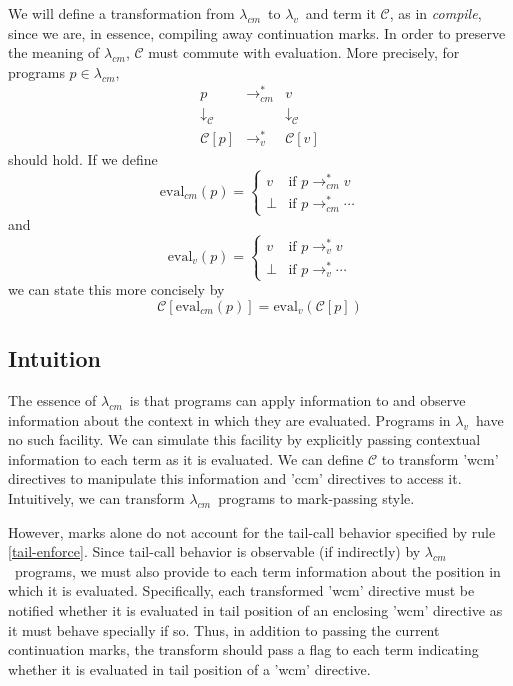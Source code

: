 \documentclass{llncs}
\newcommand{\cm}[0]{$\lambda_{cm}$}
\newcommand{\lv}[0]{$\lambda_v$}
\newcommand{\lvrrs}[0]{\rightarrow_v^{*}}
\newcommand{\cmrrs}[0]{\rightarrow_{cm}^{*}}
\newcommand{\C}[1]{\mathcal{C}[#1]}
\newcommand{\evalv}[1]{\mathrm{eval}_v(#1)}
\newcommand{\evalcm}[1]{\mathrm{eval}_{cm}(#1)}
\begin{document}
We will define a transformation from \cm\ to \lv\ and term it $\mathcal{C}$, as in \emph{compile}, since we are, in essence, compiling away continuation marks. In order to preserve the meaning of \cm, $\mathcal{C}$ must commute with evaluation. More precisely, for programs $p\in\lambda_{cm}$,
\[
\begin{array}{ccc}
p & \cmrrs & v\\
\downarrow_\mathcal{C} & & \downarrow_\mathcal{C}\\
\C{p} & \lvrrs & \C{v}
\end{array}
\]
should hold. If we define 
\begin{equation}
\evalcm{p}=\begin{cases}
v     &\text{if $p\cmrrs v$}\\
\perp &\text{if $p\cmrrs\cdots$}
\end{cases}
\end{equation}
and
\begin{equation}
\evalv{p}=\begin{cases}
v     &\text{if $p\lvrrs v$}\\
\perp &\text{if $p\lvrrs\cdots$}
\end{cases}
\end{equation}
we can state this more concisely by 
\begin{equation}
\C{\evalcm{p}}=\evalv{\C{p}}
\end{equation}

\subsection{Intuition}

The essence of \cm\ is that programs can apply information to and observe information about the context in which they are evaluated. Programs in \lv\ have no such facility. We can simulate this facility by explicitly passing contextual information to each term as it is evaluated. We can define $\mathcal{C}$ to transform \scheme'wcm' directives to manipulate this information and \scheme'ccm' directives to access it. Intuitively, we can transform \cm\ programs to mark-passing style.

However, marks alone do not account for the tail-call behavior specified by rule \ref{tail-enforce}. Since tail-call behavior is observable (if indirectly) by \cm\ programs, we must also provide to each term information about the position in which it is evaluated. Specifically, each transformed \scheme'wcm' directive must be notified whether it is evaluated in tail position of an enclosing \scheme'wcm' directive as it must behave specially if so. Thus, in addition to passing the current continuation marks, the transform should pass a flag to each term indicating whether it is evaluated in tail position of a \scheme'wcm' directive.
\end{document}
